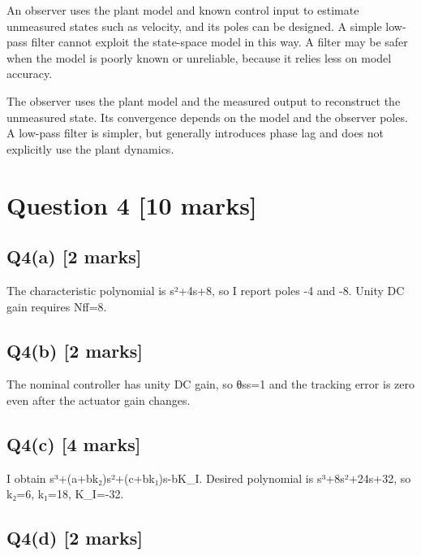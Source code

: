 \documentclass[11pt,a4paper]{article}
\begin{document}
An observer uses the plant model and known control input to estimate unmeasured states such as velocity, and its poles can be designed.
A simple low-pass filter cannot exploit the state-space model in this way.
A filter may be safer when the model is poorly known or unreliable, because it relies less on model accuracy.\par\smallskip The observer uses the plant model and the measured output to reconstruct the unmeasured state. Its convergence depends on the model and the observer poles. A low-pass filter is simpler, but generally introduces phase lag and does not explicitly use the plant dynamics.

\section*{Question 4 \hfill [10 marks]}
\subsection*{Q4(a) \hfill [2 marks]}

The characteristic polynomial is s²+4s+8, so I report poles -4 and -8.
Unity DC gain requires Nff=8.

\subsection*{Q4(b) \hfill [2 marks]}

The nominal controller has unity DC gain, so θss=1 and the tracking error is zero even after the actuator gain changes.

\subsection*{Q4(c) \hfill [4 marks]}

I obtain s³+(a+bk₂)s²+(c+bk₁)s-bK\_I.
Desired polynomial is s³+8s²+24s+32, so k₂=6, k₁=18, K\_I=-32.

\subsection*{Q4(d) \hfill [2 marks]}

\vspace{2mm}
\end{document}
